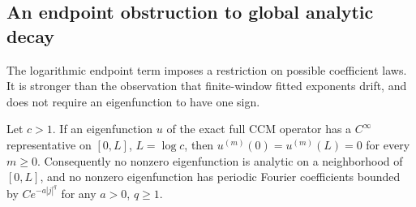\subsection{An endpoint obstruction to global analytic decay}
\label{ssec:endpoint}

The logarithmic endpoint term imposes a restriction on possible coefficient
laws. It is stronger than the observation that finite-window fitted exponents
drift, and does not require an eigenfunction to have one sign.

\begin{proposition}
\label{prop:endpointflat}
Let $c>1$. If an eigenfunction $u$ of the exact full CCM operator has a
$C^\infty$ representative on $[0,L]$, $L=\log c$, then
$u^{(m)}(0)=u^{(m)}(L)=0$ for every $m\ge0$.
Consequently no nonzero eigenfunction is analytic on a neighborhood of
$[0,L]$, and no nonzero eigenfunction has periodic Fourier coefficients
bounded by $Ce^{-a|j|^q}$ for any $a>0$, $q\ge1$.
\end{proposition}
